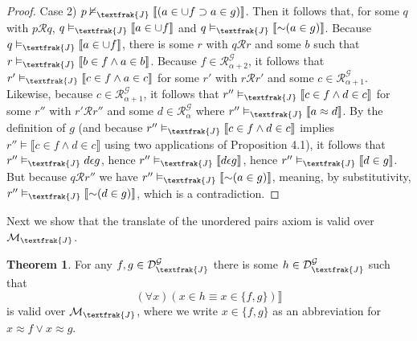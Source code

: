 \documentclass{article}
\newcommand*{\oldneg}{\mathord{\sim}}
\newcommand{\lbc}{\llbracket}
\newcommand{\rbc}{\rrbracket}
\theoremstyle{definition}
\newtheorem{theorem}{Theorem}[section]
\begin{document}
\begin{proof}
Case 2) $p\nvDash_\textfrak{J}\lbc (a\in\cup f\supset a\in g)\rbc$. Then it follows that, for some 
$q$ with $p\mathcal{R}q$, $q\vDash_\textfrak{J}\lbc a\in\cup f\rbc$ and $q\vDash_\textfrak{J}\lbc\oldneg(a\in g)\rbc$. Because 
$q\vDash_\textfrak{J}\lbc a\in\cup f\rbc$, there is some $r$ with $q\mathcal{R}r$ and some $b$ such that
$r\vDash_\textfrak{J}\lbc b\in f\wedge a\in b\rbc$. Because $f\in\mathcal{R}^\mathcal{G}_{\alpha+2}$, it follows that
$r'\vDash_\textfrak{J}\lbc c\in f\wedge a\in c\rbc$ for some $r'$ with $r\mathcal{R}r'$ and some 
$c\in\mathcal{R}^\mathcal{G}_{\alpha+1}$. Likewise, because $c\in\mathcal{R}^\mathcal{G}_{\alpha+1}$, it follows that
$r''\vDash_\textfrak{J}\lbc c\in f\wedge d\in c\rbc$ for some $r''$ with $r'\mathcal{R}r''$ and some
$d\in\mathcal{R}^\mathcal{G}_\alpha$ where $r''\vDash_\textfrak{J}\lbc a\approx d\rbc$. By the definition of $g$ (and 
because $r''\vDash_\textfrak{J}\lbc c\in f\wedge d\in c\rbc$ implies $r''\vDash\lbc c\in f\wedge d\in c\rbc$ using two applications of 
Proposition 4.1), it follows that
$r''\vDash_\textfrak{J} d\epsilon g$, hence $r''\vDash_\textfrak{J}\lbc d\epsilon g\rbc$, hence 
$r''\vDash_\textfrak{J}\lbc d\in g\rbc$. But because $q\mathcal{R}r''$ we have
$r''\vDash_\textfrak{J}\lbc\oldneg(a\in g)\rbc$, meaning, by substitutivity, $r''\vDash_\textfrak{J}\lbc\oldneg(d\in g)\rbc$, which 
is a contradiction.

\end{proof}

Next we show that the translate of the unordered pairs axiom is valid over $\mathcal{M}_\textfrak{J}$.

\begin{theorem}
For any $f,g\in\mathcal{D}^\mathcal{G}_\textfrak{J}$ there is some $h\in\mathcal{D}^\mathcal{G}_\textfrak{J}$ such that
\[ (\forall x)(x\in h\equiv x\in\{f,g\})\rbc \]
is valid over $\mathcal{M}_\textfrak{J}$, where we write $x\in\{f,g\}$ as an abbreviation for $x\approx f\vee x\approx g$.
\end{theorem}
\end{document}
